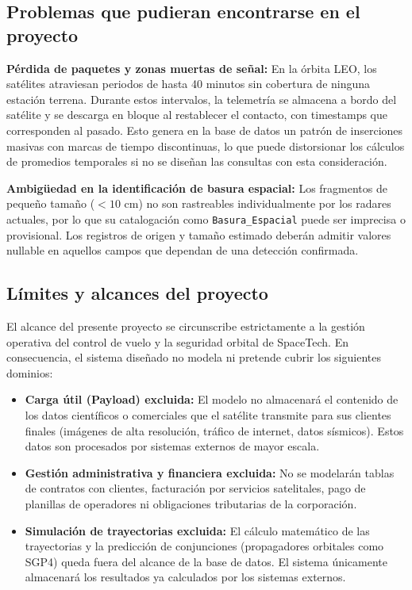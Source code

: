 \subsection{Problemas que pudieran encontrarse en el proyecto}

\textbf{Pérdida de paquetes y zonas muertas de señal:} En la órbita LEO, los satélites atraviesan periodos de hasta 40 minutos sin cobertura de ninguna estación terrena. Durante estos intervalos, la telemetría se almacena a bordo del satélite y se descarga en bloque al restablecer el contacto, con timestamps que corresponden al pasado. Esto genera en la base de datos un patrón de inserciones masivas con marcas de tiempo discontinuas, lo que puede distorsionar los cálculos de promedios temporales si no se diseñan las consultas con esta consideración.

\textbf{Ambigüedad en la identificación de basura espacial:} Los fragmentos de pequeño tamaño ($<10$ cm) no son rastreables individualmente por los radares actuales, por lo que su catalogación como \texttt{Basura\_Espacial} puede ser imprecisa o provisional. Los registros de origen y tamaño estimado deberán admitir valores nullable en aquellos campos que dependan de una detección confirmada.

\subsection{Límites y alcances del proyecto}

El alcance del presente proyecto se circunscribe estrictamente a la gestión operativa del control de vuelo y la seguridad orbital de SpaceTech. En consecuencia, el sistema diseñado no modela ni pretende cubrir los siguientes dominios:

\begin{itemize}
    \item \textbf{Carga útil (Payload) excluida:} El modelo no almacenará el contenido de los datos científicos o comerciales que el satélite transmite para sus clientes finales (imágenes de alta resolución, tráfico de internet, datos sísmicos). Estos datos son procesados por sistemas externos de mayor escala.
    \item \textbf{Gestión administrativa y financiera excluida:} No se modelarán tablas de contratos con clientes, facturación por servicios satelitales, pago de planillas de operadores ni obligaciones tributarias de la corporación.
    \item \textbf{Simulación de trayectorias excluida:} El cálculo matemático de las trayectorias y la predicción de conjunciones (propagadores orbitales como SGP4) queda fuera del alcance de la base de datos. El sistema únicamente almacenará los resultados ya calculados por los sistemas externos.
\end{itemize}
